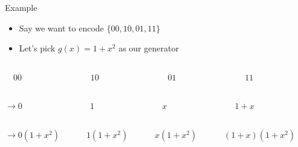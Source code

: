 \documentclass[aspectratio=169]{beamer}
\begin{document}
\begin{frame}{Example}
    \begin{itemize}
        \item Say we want to encode $\{00, 10, 01, 11\}$
        \item Let's pick $g(x) = 1 + x^2$ as our generator
    \end{itemize} \pause

    \bigskip

    \begin{columns}[c]
    \begin{column}{3cm}
        $\quad 00$
    \end{column}
    \begin{column}{3cm}
        $10$
    \end{column}
    \begin{column}{3cm}
        $01$
    \end{column}
    \begin{column}{3cm}
        $11$
    \end{column}
    \hfill
    \end{columns} \pause

    \begin{columns}[c]
    \begin{column}{3cm}
        $\to 0$
    \end{column}
    \begin{column}{3cm}
        $1$
    \end{column}
    \begin{column}{3cm}
        $x$
    \end{column}
    \begin{column}{3cm}
        $1 + x$
    \end{column}
    \hfill
    \end{columns} \pause

    \begin{columns}[c]
    \begin{column}{3cm}
        $\to 0 (1 + x^2)$
    \end{column}
    \begin{column}{3cm}
        $1 (1 + x^2)$
    \end{column}
    \begin{column}{3cm}
        $x (1 + x^2)$
    \end{column}
    \begin{column}{3cm}
        $(1 + x) (1 + x^2)$
    \end{column}
    \hfill
    \end{columns} \pause


\end{frame}
\end{document}
